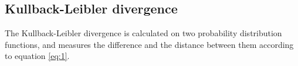 \documentclass{bmcart}
\begin{document}

\subsection*{Kullback-Leibler divergence}
The Kullback-Leibler divergence is calculated on two probability distribution functions, and measures the difference and the distance between them according to equation \ref{eq:1}.
\end{document}
